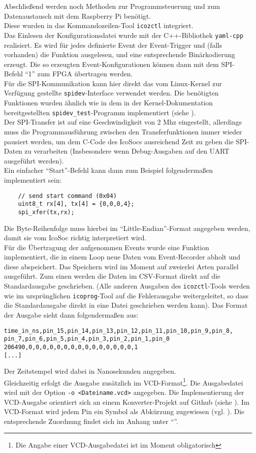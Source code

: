 {Abschließend werden noch Methoden zur Programmsteuerung und zum Datenaustausch mit dem Raspberry Pi benötigt.\\
Diese wurden in das Kommandozeilen-Tool {\tt icozctl} integriert.\\
Das Einlesen der Konfigurationsdatei wurde mit der C++-Bibliothek {\tt yaml-cpp} realisiert. Es wird für jedes definierte Event der Event-Trigger und (falls vorhanden) die Funktion ausgelesen, und eine entsprechende Binärkodierung erzeugt. Die so erzeugten Event-Konfigurationen können dann mit dem SPI-Befehl ``1'' zum FPGA übertragen werden.\\ 
Für die SPI-Kommunikation kann hier direkt das vom Linux-Kernel zur Verfügung gestellte {\tt spidev}-Interface verwendet werden. Die benötigten Funktionen wurden ähnlich wie in dem in der Kernel-Dokumentation bereitgestellten {\tt spidev\_test}-Programm implementiert (siehe \cite{web:spidev_test}).\\
Der SPI-Transfer ist auf eine Geschwindigkeit von 2 Mhz eingestellt, allerdings muss die Programmausführung zwischen den Transferfunktionen immer wieder pausiert werden, um dem C-Code des IcoSocs ausreichend Zeit zu geben die SPI-Daten zu verarbeiten (Insbesondere wenn Debug-Ausgaben auf den UART ausgeführt werden).\\
Ein einfacher ``Start''-Befehl kann dann zum Beispiel folgendermaßen implementiert sein:
\begin{verbatim}
	// send start command (0x04)
	uint8_t rx[4], tx[4] = {0,0,0,4};
	spi_xfer(tx,rx);
\end{verbatim}
Die Byte-Reihenfolge muss hierbei im ``Little-Endian''-Format angegeben werden, damit sie vom IcoSoc richtig interpretiert wird.\\
Für die Übertragung der aufgenommen Events wurde eine Funktion implementiert, die in einem Loop neue Daten vom Event-Recorder abholt und diese abspeichert. 
Das Speichern wird im Moment auf zweierlei Arten parallel ausgeführt. Zum einen werden die Daten im \acrshort{CSV}-Format direkt auf die Standardausgabe geschrieben. (Alle anderen Ausgaben des {\tt icozctl}-Tools werden wie im ursprünglichen {\tt icoprog}-Tool auf die Fehlerausgabe weitergeleitet, so dass die Standardausgabe direkt in eine Datei geschrieben werden kann). Das Format der Ausgabe sieht dann folgendermaßen aus:
\begin{verbatim}
time_in_ns,pin_15,pin_14,pin_13,pin_12,pin_11,pin_10,pin_9,pin_8, pin_7,pin_6,pin_5,pin_4,pin_3,pin_2,pin_1,pin_0
206490,0,0,0,0,0,0,0,0,0,0,0,0,0,0,0,1
[...]
\end{verbatim}
Der Zeitstempel wird dabei in Nanosekunden angegeben.\\
Gleichzeitig erfolgt die Ausgabe zusätzlich im \acrshort{VCD}-Format\footnote{Die Angabe einer VCD-Ausgabedatei ist im Moment obligatorisch}. Die Ausgabedatei wird mit der Option {\tt -o <Dateiname.vcd>} angegeben. Die Implementierung der VCD-Ausgabe orientiert sich an einem Konverter-Projekt auf Github (siehe \cite{web:la2vcd2}). Im VCD-Format wird jedem Pin ein Symbol als Abkürzung zugewiesen (vgl. \cite{wiki:VCD}). Die entsprechende Zuordnung findet sich im Anhang unter ``''.  

}
